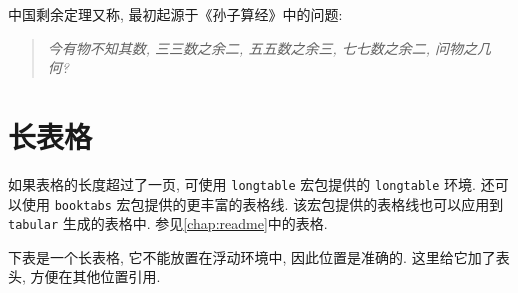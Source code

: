\begin{remark}\label{rem:CRT}
  中国剩余定理又称, 最初起源于《孙子算经》中的问题:
  \begin{quote}
    \itshape
    今有物不知其数, 三三数之余二, 五五数之余三, 七七数之余二, 问物之几何?
  \end{quote}
\end{remark}

\section{长表格}

如果表格的长度超过了一页, 可使用 \verb|longtable| 宏包提供的 \verb|longtable| 环境.
还可以使用 \verb|booktabs| 宏包提供的更丰富的表格线.
该宏包提供的表格线也可以应用到 \verb|tabular| 生成的表格中.
参见\autoref{chap:readme}中的表格.

下表是一个长表格, 它不能放置在浮动环境中, 因此位置是准确的.
这里给它加了表头, 方便在其他位置引用.

